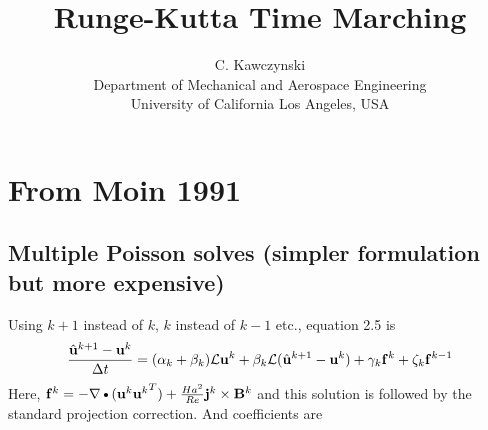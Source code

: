 \documentclass[11pt]{article}
\begin{document}
\doublespacing
\title{Runge-Kutta Time Marching}
\author{C. Kawczynski \\
Department of Mechanical and Aerospace Engineering \\
University of California Los Angeles, USA\\
}
\maketitle

\section{From Moin 1991}

\subsection{Multiple Poisson solves (simpler formulation but more expensive)}
Using $k+1$ instead of $k$, $k$ instead of $k-1$ etc., equation 2.5 is
\begin{equation}\begin{aligned}
\frac{\hat{\mathbf{u}}^{k+1}-\mathbf{u}^k}{\Delta t} = (\alpha_k+\beta_k) \mathcal L \mathbf{u}^k + \beta_k \mathcal L (\hat{\mathbf{u}}^{k+1} - \mathbf{u}^k)  + \gamma_k \mathbf{f}^k + \zeta_k \mathbf{f}^{k-1}  \\
\end{aligned} \end{equation}
Here, $\F^k = - \DEL \DOT (\U^k {\U^k}^T) + \frac{Ha^2}{Re} \J^k \CROSS \B^k$ and this solution is followed by the standard projection correction.
And coefficients are
\end{document}
